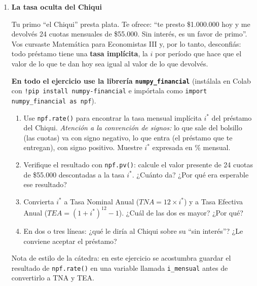 \documentclass[a4paper,11pt]{article}
\begin{document}
\begin{enumerate}
\item \textbf{La tasa oculta del Chiqui}

Tu primo ``el Chiqui'' presta plata. Te ofrece: ``te presto \$1.000.000 hoy y me devolvés 24 cuotas mensuales de \$55.000. Sin interés, es un favor de primo''. Vos cursaste Matemática para Economistas III y, por lo tanto, desconfiás: todo préstamo tiene una \textbf{tasa implícita}, la $i$ por período que hace que el valor de lo que te dan hoy sea igual al valor de lo que devolvés.

\textbf{En todo el ejercicio use la librería \texttt{numpy\_financial}} (instálala en Colab con \texttt{!pip install numpy-financial} e impórtala como \texttt{import numpy\_financial as npf}).

\begin{enumerate}
    \item Use \texttt{npf.rate()} para encontrar la tasa mensual implícita $i^{*}$ del préstamo del Chiqui. \textit{Atención a la convención de signos:} lo que sale del bolsillo (las cuotas) va con signo negativo, lo que entra (el préstamo que te entregan), con signo positivo. Muestre $i^{*}$ expresada en \% mensual.
    \item Verifique el resultado con \texttt{npf.pv()}: calcule el valor presente de 24 cuotas de \$55.000 descontadas a la tasa $i^{*}$. ¿Cuánto da? ¿Por qué era esperable ese resultado?
    \item Convierta $i^{*}$ a Tasa Nominal Anual ($TNA = 12 \times i^{*}$) y a Tasa Efectiva Anual ($TEA = (1+i^{*})^{12} - 1$). ¿Cuál de las dos es mayor? ¿Por qué?
    \item En dos o tres líneas: ¿qué le diría al Chiqui sobre su ``sin interés''? ¿Le conviene aceptar el préstamo?
\end{enumerate}
{\color{white}Nota de estilo de la cátedra: en este ejercicio se acostumbra guardar el resultado de \texttt{npf.rate()} en una variable llamada \texttt{i\_mensual} antes de convertirlo a TNA y TEA.}

\end{enumerate}
\end{document}
